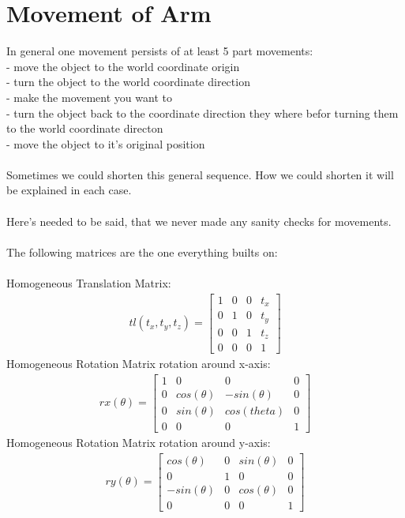 \section{Movement of Arm}
In general one movement persists of at least 5 part movements:\\
- move the object to the world coordinate origin\\
- turn the object to the world coordinate direction\\
- make the movement you want to\\
- turn the object back to the coordinate direction they where befor turning them to the world coordinate directon\\
- move the object to it's original position\\\\
Sometimes we could shorten this general sequence. How we could shorten it will be explained in each case.\\\\
Here's needed to be said, that we never made any sanity checks for movements.\\\\
The following matrices are the one everything builts on:\\\\
Homogeneous Translation Matrix:
\begin{align*}
tl(t_x,t_y,t_z)=
\begin{bmatrix} 
1 & 0 & 0 & t_x \\ 
0 & 1 & 0 & t_y \\ 
0 & 0 & 1 & t_z \\ 
0 & 0 & 0 & 1
\end{bmatrix}
\end{align*}
Homogeneous Rotation Matrix rotation around x-axis:
\begin{align*}
rx(\theta)=
\begin{bmatrix} 
1 & 0 & 0 & 0 \\ 
0 & cos(\theta) & -sin(\theta) & 0 \\ 
0 & sin(\theta) & cos(theta) & 0 \\ 
0 & 0 & 0 & 1
\end{bmatrix}
\end{align*}
Homogeneous Rotation Matrix rotation around y-axis:
\begin{align*}
ry(\theta)=
\begin{bmatrix} 
cos(\theta) & 0 & sin(\theta) & 0 \\ 
0 & 1 & 0 & 0 \\ 
-sin(\theta) & 0 & cos(\theta) & 0 \\ 
0 & 0 & 0 & 1
\end{bmatrix}
\end{align*}
